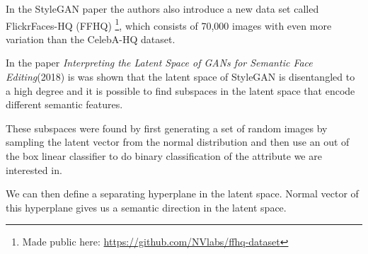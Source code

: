 In the StyleGAN paper the authors also introduce a new data set called FlickrFaces-HQ (FFHQ) \footnote{Made public here: \url{https://github.com/NVlabs/ffhq-dataset}}, which consists of 70,000 images with even more variation than the CelebA-HQ dataset.\cite{stylegan}

In the paper \textit{Interpreting the Latent Space of GANs for Semantic Face Editing}(2018)\cite{interfacegan} is was shown that the latent space of StyleGAN is disentangled to a high degree and it is possible to find subspaces in the latent space that encode different semantic features.

These subspaces were found by first generating a set of random images by sampling the latent vector from the normal distribution and then use an out of the box linear classifier to do binary classification of the attribute we are interested in.

We can then define a separating hyperplane in the latent space. Normal vector of this hyperplane gives us a semantic direction in the latent space.









%
%



%
%
%
